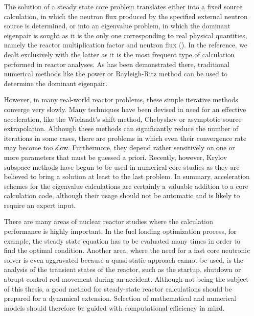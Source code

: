 The solution of a steady state core problem translates either into a fixed source calculation, in which the neutron flux
produced by the specified external neutron source is determined, or into an eigenvalue problem, in which the dominant
eigenpair is sought as it is the only one corresponding to real physical quantities, namely the reactor multiplication
factor and neutron flux (\cite[Sec. 3.3.1.1]{bib:HanusBP}). In the reference, we dealt exclusively with the latter as it
is the most frequent type of calculation performed in reactor analyses. As has been demonstrated there, traditional
numerical methods like the power or Rayleigh-Ritz method can be used to determine the dominant eigenpair.

However, in many real-world reactor problems, these simple iterative methods converge very slowly. Many techniques have
been devised in need for an effective acceleration, like the Wielandt's shift method, Chebyshev or asymptotic source
extrapolation. Although these methods can significantly reduce the number of iterations in some cases, there are
problems in which even their convergence rate may become too slow. Furthermore, they depend rather sensitively on one or
more parameters that must be guessed a priori. Recently, however, Krylov subspace methods have begun to be used in
numerical core studies as they are believed to bring a solution at least to the last problem. In summary, acceleration
schemes for the eigenvalue calculations are certainly a valuable addition to a core calculation code, although their
usage should not be automatic and is likely to require an expert input.

There are many areas of nuclear reactor studies where the calculation performance is highly important. In the fuel
loading optimization process, for example, the steady state equation has to be evaluated many times in order to find the
optimal condition. Another area, where the need for a fast core neutronic solver is even aggravated because a
quasi-static approach cannot be used, is the analysis of the transient states of the reactor, such as the startup,
shutdown or abrupt control rod movement during an accident. Although not being the subject of this thesis, a good method
for steady-state reactor calculations should be prepared for a dynamical extension. Selection of mathematical and
numerical models should therefore be guided with computational efficiency in mind.


